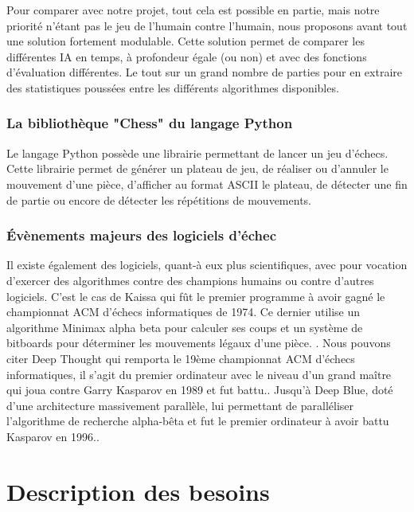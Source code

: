 \huge\documentclass{article}
\begin{document}
Pour comparer avec notre projet, tout cela est possible en partie, mais notre priorité n'étant pas le jeu de l'humain contre l'humain, nous proposons avant tout une solution fortement modulable. Cette solution permet de comparer les différentes IA en temps, à profondeur égale (ou non) et avec des fonctions d'évaluation différentes. Le tout sur un grand nombre de parties pour en extraire des statistiques poussées entre les différents algorithmes disponibles.
\newline

\subsubsection{La bibliothèque "Chess" du langage Python} \label{python}
Le langage Python possède une librairie permettant de lancer un jeu d'échecs. Cette librairie permet de générer un plateau de jeu, de réaliser ou d'annuler le mouvement d'une pièce, d'afficher au format ASCII le plateau, de détecter une fin de partie ou encore de détecter les répétitions de mouvements.

\subsubsection{Évènements majeurs des logiciels d'échec}

Il existe également des logiciels, quant-à eux plus scientifiques, avec pour vocation d'exercer des algorithmes contre des champions humains ou contre d'autres logiciels.
\newline
C'est le cas de Kaissa qui fût le premier programme à avoir gagné le championnat ACM d'échecs informatiques de 1974. Ce dernier utilise un algorithme Minimax alpha beta \cite{KaissaAB} pour calculer ses coups et un système de bitboards pour déterminer les mouvements légaux d'une pièce. \cite{Kaissa}\cite{KaissaBitboard}\cite{RotatedBitBoards}.
\newline
Nous pouvons citer Deep Thought qui remporta le 19ème championnat ACM d'échecs informatiques, il s'agit du premier ordinateur avec le niveau d'un grand maître qui joua contre Garry Kasparov en 1989 et fut battu.\cite{Deep}. 
\newline
Jusqu'à Deep Blue, doté d'une architecture massivement parallèle, lui permettant de paralléliser l'algorithme de recherche alpha-bêta\cite{DeepSystem} et fut le premier ordinateur à avoir battu Kasparov en 1996.\cite{Deep}.

\section{Description des besoins}
\end{document}
